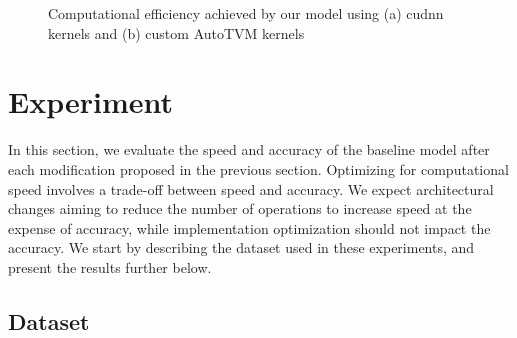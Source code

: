 \documentclass[runningheads]{llncs}
\begin{document}
\begin{figure}[h]
\centering
{}
\centering
\caption{Computational efficiency achieved by our model using (a) cudnn kernels and (b) custom AutoTVM kernels}
\end{figure}


\section{Experiment}



In this section, we evaluate the speed and accuracy of the baseline model after each modification proposed in the previous section.
Optimizing for computational speed involves a trade-off between speed and accuracy.
We expect architectural changes aiming to reduce the number of operations to increase speed at the expense of accuracy,
while implementation optimization should not impact the accuracy.
We start by describing the dataset used in these experiments, and present the results further below.

\subsection{Dataset}
\end{document}
